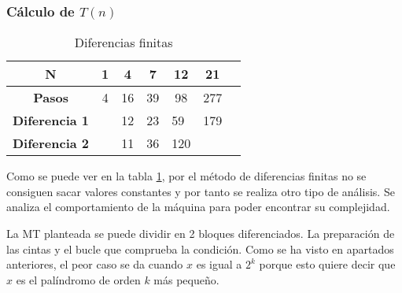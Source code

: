 \documentclass{uc3mpracticas}
\begin{document}
  \subsubsection{Cálculo de $T(n)$}


  \begin{table}[!h]
    \centering
  \begin{tabular}{|c|p{1cm}|p{1cm}|p{1cm}|p{1cm}|p{1cm}|p{1cm}|}
  \hline
  \textbf{N}     & \multicolumn{1}{c|}{\textbf{1}} & \multicolumn{1}{c|}{\textbf{4}} & \multicolumn{1}{c|}{\textbf{7}} & \multicolumn{1}{c|}{\textbf{12}} & \multicolumn{1}{c|}{\textbf{21}} \\ \hline
  \textbf{Pasos} & \multicolumn{1}{c|}{4}          & \multicolumn{1}{c|}{16}          & \multicolumn{1}{c|}{39}         & \multicolumn{1}{c|}{98}         & \multicolumn{1}{c|}{277} \\ \hline
  \textbf{Diferencia 1}                  &                                                         & 12                                                       & 23                               & 59                              &   179                           \\ \hline
  \textbf{Diferencia 2}                  &                                                         & \multicolumn{1}{r|}{11}                                  & \multicolumn{1}{r|}{36}          & \multicolumn{1}{r|}{120}       &                         \\ \hline
  \end{tabular}
  \caption{Diferencias finitas}
  \label{tab:diferencias_finitas_pk}
  \end{table}




  Como se puede ver en la tabla \ref{tab:diferencias_finitas_pk}, por el método de diferencias finitas no se consiguen sacar valores constantes y por tanto se realiza otro tipo de análisis. Se analiza el comportamiento de la máquina para poder encontrar su complejidad.

  \vspace{2mm}

  La MT planteada se puede dividir en 2 bloques diferenciados. La preparación de las cintas y el bucle que comprueba la condición. Como se ha visto en apartados anteriores, el peor caso se da cuando $x$ es igual a $2^k$ porque esto quiere decir que $x$ es el palíndromo de orden $k$ más pequeño.

  \vspace{2mm}
\end{document}
